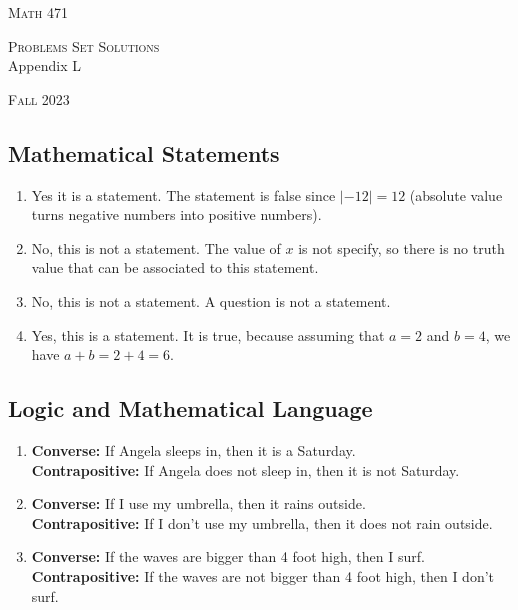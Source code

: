 


\hrulefill

\begin{minipage}{0.33\textwidth}
\textsc{Math 471}
\end{minipage} \hfill 
\begin{minipage}{0.32\textwidth}
\centering
\textsc{Problems Set Solutions} \\
Appendix L
\end{minipage}
 \hfill 
 \begin{minipage}{0.33\textwidth}
 \flushright \textsc{Fall 2023}
 \end{minipage}

\hrulefill

\setcounter{section}{12}

 \subsection[~~Mathematical Statements]{Mathematical Statements}

 \begin{problem}
\begin{enumerate}[label=\alph*)]
\item Yes it is a statement. The statement is false since $|-12| = 12$ (absolute value turns negative numbers into positive numbers).
\item No, this is not a statement. The value of $x$ is not specify, so there is no truth value that can be associated to this statement.
\item No, this is not a statement. A question is not a statement.
\item Yes, this is a statement. It is true, because assuming that $a = 2$ and $b = 4$, we have $a + b = 2 + 4 = 6$.
\end{enumerate}
 \end{problem}

 \subsection[~~Logic and Mathematical Language]{Logic and Mathematical Language}

  \begin{problem}
 \begin{enumerate}[label=\alph*)]
 \item \textbf{Converse:} If Angela sleeps in, then it is a Saturday. \\
 \textbf{Contrapositive:} If Angela does not sleep in, then it is not Saturday.
 \item \textbf{Converse:} If I use my umbrella, then it rains outside. \\
 \textbf{Contrapositive:} If I don't use my umbrella, then it does not rain outside.
 \item \textbf{Converse:} If the waves are bigger than 4 foot high, then I surf.\\ 
 \textbf{Contrapositive:} If the waves are not bigger than 4 foot high, then I don't surf.
 \end{enumerate}
 \end{problem}

